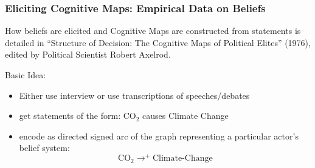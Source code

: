 \documentclass{beamer}
\begin{document}
\begin{frame}
\frametitle{Eliciting Cognitive Maps: Empirical Data on Beliefs}
How beliefs are elicited and Cognitive Maps are constructed from statements is detailed in ``Structure of Decision: The Cognitive Maps of Political Elites'' (1976), edited by Political Scientist Robert Axelrod.

Basic Idea:

\begin{itemize}
\item Either use interview or use transcriptions of speeches/debates
\item get statements of the form: CO$_2$ causes Climate Change
\item encode as directed signed arc of the graph representing a particular actor's belief system:
$$\text{CO}_2 \rightarrow^+ \text{Climate-Change}$$
\end{itemize}
\end{frame}
\end{document}
